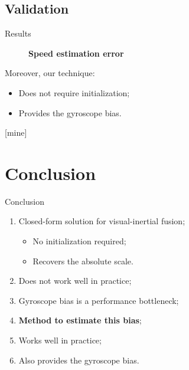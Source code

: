 \documentclass{beamer}
\begin{document}
\subsection{Validation}

\begin{frame}{Results}
  \begin{figure}[h!]
    \centering
    \textbf{Speed estimation error}\\
    \vspace{1em}

    \resizebox{0.5\textwidth}{!}{}
  \end{figure}

  Moreover, our technique:
  \begin{itemize}
    \item Does not require initialization;
    \item Provides the gyroscope bias.
  \end{itemize}

\end{frame}


[mine]

\section{Conclusion}

\begin{frame}{Conclusion}

  \begin{enumerate}
  \item Closed-form solution for visual-inertial fusion;
    \begin{itemize}
      \item No initialization required;
      \item Recovers the absolute scale.
    \end{itemize}
  \item<2-> Does not work well in practice;
  \item<3-> Gyroscope bias is a performance bottleneck;
  \item<4-> \textbf{Method to estimate this bias};
  \item<5-> Works well in practice;
  \item<6-> Also provides the gyroscope bias.
  \end{enumerate}

\end{frame}
\end{document}
